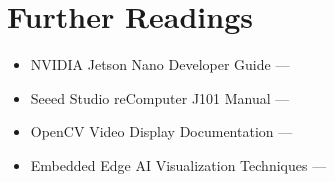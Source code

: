 \section{Further Readings}
\begin{itemize}
	\item NVIDIA Jetson Nano Developer Guide — \cite{jetson_nano_doc}
	\item Seeed Studio reComputer J101 Manual — \cite{seeedJ101Manual}
	\item OpenCV Video Display Documentation — \cite{opencv_doc_2024}
	\item Embedded Edge AI Visualization Techniques — \cite{edgeAIbook}
\end{itemize}
